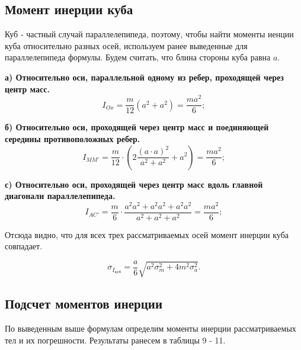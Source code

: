 \documentclass[a4paper, 12pt]{article}
\begin{document}
        \subsection*{Момент инерции куба}

        Куб - частный случай параллелепипеда, поэтому, чтобы найти моменты иенции куба относительно разных осей, используем ранее выведенные для параллелепипеда формулы. Будем считать, что блина стороны куба равна $a$.

        \textbf{а) Относительно оси, параллельной одному из ребер, проходящей через центр масс.}
        \begin{equation*}
            I_{Ox} = \frac{m}{12}(a^2 + a^2) = \frac{ma^2}{6};
        \end{equation*}
        
        \textbf{б) Относительно оси, проходящей через центр масс и поединяющей середины противоположных ребер.}
        \begin{equation*}
            I_{MM'} = \frac{m}{12} \cdot \left(2\frac{(a\cdot a)^2}{a^2+a^2} + a^2 \right) = \frac{ma^2}{6};
        \end{equation*}
        
        \textbf{с) Относительно оси, проходящей через центр масс вдоль главной диагонали параллелепипеда.}
        \begin{equation*}
            I_{AC'} = \frac{m}{6}\cdot \frac{a^2a^2+a^2a^2+a^2a^2}{a^2+a^2+a^2} = \frac{ma^2}{6};
        \end{equation*}

        Отсюда видно, что для всех трех рассматриваемых осей момент инерции куба совпадает. 

        \begin{equation*}
            \sigma_{I_{куб}} = \frac{a}{6}\sqrt{a^2\sigma_m^2+4m^2\sigma_a^2}.
        \end{equation*}

        \subsection*{Подсчет моментов инерции}

        По выведенным выше формулам определим моменты инерции рассматриваемых тел и их погрешности. Результаты ранесем в таблицы 9 - 11.
\end{document}

